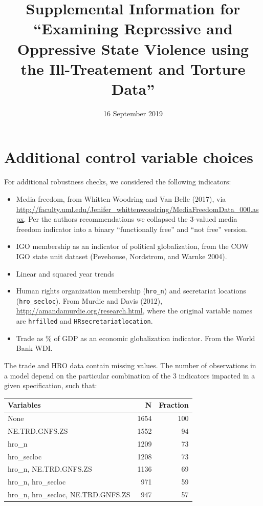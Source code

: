 \documentclass[]{article}
\title{Supplemental Information for ``Examining Repressive and Oppressive State
Violence using the Ill-Treatement and Torture Data''}
\author{}
\date{16 September 2019}
\providecommand{\tightlist}{%
  \setlength{\itemsep}{0pt}\setlength{\parskip}{0pt}}
\begin{document}
\maketitle

{
\setcounter{tocdepth}{2}
\tableofcontents
}
\hypertarget{additional-control-variable-choices}{%
\section{Additional control variable
choices}\label{additional-control-variable-choices}}

For additional robustness checks, we considered the following
indicators:

\begin{itemize}
\tightlist
\item
  Media freedom, from Whitten-Woodring and Van Belle (2017), via
  \url{http://faculty.uml.edu/Jenifer_whittenwoodring/MediaFreedomData_000.aspx}.
  Per the authors recommendations we collapsed the 3-valued media
  freedom indicator into a binary ``functionally free'' and ``not free''
  version.
\item
  IGO membership as an indicator of political globalization, from the
  COW IGO state unit dataset (Pevehouse, Nordstrom, and Warnke 2004).
\item
  Linear and squared year trends
\item
  Human rights organization membership (\texttt{hro\_n}) and secretariat
  locations (\texttt{hro\_secloc}). From Murdie and Davis (2012),
  \url{http://amandamurdie.org/research.html}, where the original
  variable names are \texttt{hrfilled} and
  \texttt{HRsecretariatlocation}.
\item
  Trade as \% of GDP as an economic globalization indicator. From the
  World Bank WDI.
\end{itemize}

The trade and HRO data contain missing values. The number of
observations in a model depend on the particular combination of the 3
indicators impacted in a given specification, such that:

\begin{table}[H]
\centering
\begin{tabular}{lrr}
\toprule
Variables & N & Fraction\\
\midrule
None & 1654 & 100\\
NE.TRD.GNFS.ZS & 1552 & 94\\
hro\_n & 1209 & 73\\
hro\_secloc & 1208 & 73\\
hro\_n, NE.TRD.GNFS.ZS & 1136 & 69\\
\addlinespace
hro\_n, hro\_secloc & 971 & 59\\
hro\_n, hro\_secloc, NE.TRD.GNFS.ZS & 947 & 57\\
\bottomrule
\end{tabular}
\end{table}
\end{document}
